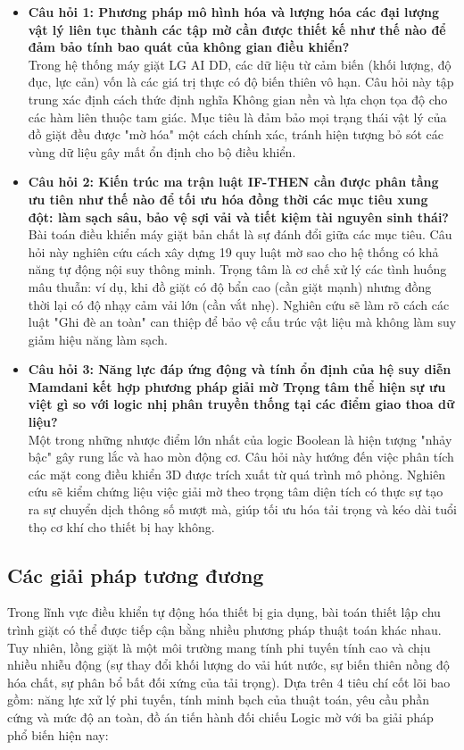 \documentclass[12pt, a4paper]{article}
\begin{document}
\begin{itemize}
    \item \textbf{Câu hỏi 1: Phương pháp mô hình hóa và lượng hóa các đại lượng vật lý liên tục thành các tập mờ cần được thiết kế như thế nào để đảm bảo tính bao quát của không gian điều khiển?}\\
    Trong hệ thống máy giặt LG AI DD, các dữ liệu từ cảm biến (khối lượng, độ đục, lực cản) vốn là các giá trị thực có độ biến thiên vô hạn. Câu hỏi này tập trung xác định cách thức định nghĩa Không gian nền và lựa chọn tọa độ cho các hàm liên thuộc tam giác. Mục tiêu là đảm bảo mọi trạng thái vật lý của đồ giặt đều được "mờ hóa" một cách chính xác, tránh hiện tượng bỏ sót các vùng dữ liệu gây mất ổn định cho bộ điều khiển.
    
    \item \textbf{Câu hỏi 2: Kiến trúc ma trận luật IF-THEN cần được phân tầng ưu tiên như thế nào để tối ưu hóa đồng thời các mục tiêu xung đột: làm sạch sâu, bảo vệ sợi vải và tiết kiệm tài nguyên sinh thái?}\\
    Bài toán điều khiển máy giặt bản chất là sự đánh đổi giữa các mục tiêu. Câu hỏi này nghiên cứu cách xây dựng 19 quy luật mờ sao cho hệ thống có khả năng tự động nội suy thông minh. Trọng tâm là cơ chế xử lý các tình huống mâu thuẫn: ví dụ, khi đồ giặt có độ bẩn cao (cần giặt mạnh) nhưng đồng thời lại có độ nhạy cảm vải lớn (cần vắt nhẹ). Nghiên cứu sẽ làm rõ cách các luật "Ghi đè an toàn" can thiệp để bảo vệ cấu trúc vật liệu mà không làm suy giảm hiệu năng làm sạch.
    
    \item \textbf{Câu hỏi 3: Năng lực đáp ứng động và tính ổn định của hệ suy diễn Mamdani kết hợp phương pháp giải mờ Trọng tâm thể hiện sự ưu việt gì so với logic nhị phân truyền thống tại các điểm giao thoa dữ liệu?}\\
    Một trong những nhược điểm lớn nhất của logic Boolean là hiện tượng "nhảy bậc" gây rung lắc và hao mòn động cơ. Câu hỏi này hướng đến việc phân tích các mặt cong điều khiển 3D được trích xuất từ quá trình mô phỏng. Nghiên cứu sẽ kiểm chứng liệu việc giải mờ theo trọng tâm diện tích có thực sự tạo ra sự chuyển dịch thông số mượt mà, giúp tối ưu hóa tải trọng và kéo dài tuổi thọ cơ khí cho thiết bị hay không.
\end{itemize}

\subsection{Các giải pháp tương đương}
Trong lĩnh vực điều khiển tự động hóa thiết bị gia dụng, bài toán thiết lập chu trình giặt có thể được tiếp cận bằng nhiều phương pháp thuật toán khác nhau. Tuy nhiên, lồng giặt là một môi trường mang tính phi tuyến tính cao và chịu nhiều nhiễu động (sự thay đổi khối lượng do vải hút nước, sự biến thiên nồng độ hóa chất, sự phân bổ bất đối xứng của tải trọng). Dựa trên 4 tiêu chí cốt lõi bao gồm: năng lực xử lý phi tuyến, tính minh bạch của thuật toán, yêu cầu phần cứng và mức độ an toàn, đồ án tiến hành đối chiếu Logic mờ với ba giải pháp phổ biến hiện nay:
\end{document}
